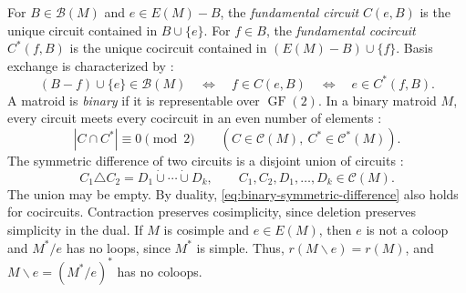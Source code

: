 \documentclass[10pt,a4paper]{article}
\numberwithin{equation}{section}
\DeclareMathOperator{\GF}{GF}
\newcommand{\BB}{\mathcal B}
\newcommand{\CC}{\mathcal C}
\newcommand{\FF}{\GF(2)}
\begin{document}
For \(B\in\BB(M)\) and \(e\in E(M)-B\), the
\emph{fundamental circuit} \(C(e,B)\) is the unique circuit
contained in \(B\cup\{e\}\). For \(f\in B\), the
\emph{fundamental cocircuit} \(C^*(f,B)\) is the unique cocircuit
contained in \((E(M)-B)\cup\{f\}\).
Basis exchange is characterized by
\cite[Section~1.2, Exercise~5 and Section~2.1, Exercise~10(b)]{Oxley2011}:
\begin{equation}\label{eq:exchange}
 (B-f)\cup\{e\}\in\BB(M)
 \quad\Longleftrightarrow\quad f\in C(e,B)
 \quad\Longleftrightarrow\quad e\in C^*(f,B).
\end{equation}
A matroid is \emph{binary} if it is representable over \(\FF\).
In a binary matroid \(M\), every circuit meets every cocircuit in an
even number of elements \cite[Theorem~9.1.2(ii)]{Oxley2011}:
\begin{equation}\label{eq:binary-orthogonality}
 |C\cap C^*|\equiv0\pmod2
 \qquad(C\in\CC(M),\ C^*\in\CC^*(M)).
\end{equation}
The symmetric difference of two circuits is a disjoint union
of circuits \cite[Theorem~9.1.2(iv)]{Oxley2011}:
\begin{equation}\label{eq:binary-symmetric-difference}
 C_1\triangle C_2=D_1\mathbin{\dot\cup}\cdots\mathbin{\dot\cup}D_k,
 \qquad C_1,C_2,D_1,\ldots,D_k\in\CC(M).
\end{equation}
The union may be empty. By duality,
\eqref{eq:binary-symmetric-difference} also holds for cocircuits.
Contraction preserves cosimplicity, since deletion preserves
simplicity in the dual. If \(M\) is cosimple and \(e\in E(M)\), then
\(e\) is not a coloop and \(M^*/e\) has no loops, since \(M^*\) is simple.
Thus, \(r(M\backslash e)=r(M)\), and
\(M\backslash e=(M^*/e)^*\) has no coloops.
\end{document}
